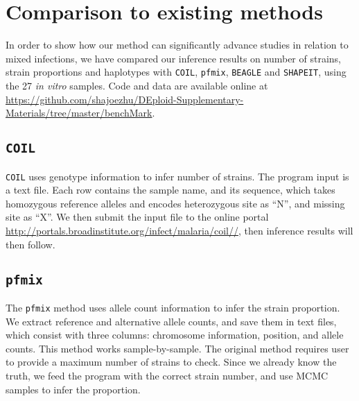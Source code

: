 \documentclass{article}
\begin{document}


\newpage
\section{Comparison to existing methods} \label{sup:sec:benchmark}

In order to show how our method can significantly advance studies in relation to mixed infections, we have compared our inference results on number of strains, strain proportions and haplotypes with \texttt{COIL}, \texttt{pfmix}, \texttt{BEAGLE} and \texttt{SHAPEIT}, using the 27 {\it in vitro} samples. Code and data are available online at \url{https://github.com/shajoezhu/DEploid-Supplementary-Materials/tree/master/benchMark}.

\subsection{\texttt{COIL}}
\texttt{COIL} uses genotype information to infer number of strains. The program input is a text file. Each row contains the sample name, and its sequence, which takes homozygous reference alleles and encodes heterozygous site as ``N'', and missing site as ``X''. We then submit the input file to the online portal \url{http://portals.broadinstitute.org/infect/malaria/coil//}, then inference results will then follow.

\subsection{\texttt{pfmix}}
The \texttt{pfmix} method uses allele count information to infer the strain proportion. We extract reference and alternative allele counts, and save them in text files, which consist with three columns: chromosome information, position, and allele counts. This method works sample-by-sample. The original method requires user to provide a maximum number of strains to check. Since we already know the truth, we feed the program with the correct strain number, and use MCMC samples to infer the proportion.
\end{document}

